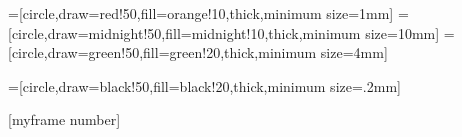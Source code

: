 =[circle,draw=red!50,fill=orange!10,thick,minimum size=1mm]
=[circle,draw=midnight!50,fill=midnight!10,thick,minimum size=10mm]
=[circle,draw=green!50,fill=green!20,thick,minimum size=4mm]

=[circle,draw=black!50,fill=black!20,thick,minimum size=.2mm]

[myframe number]
\makeatother